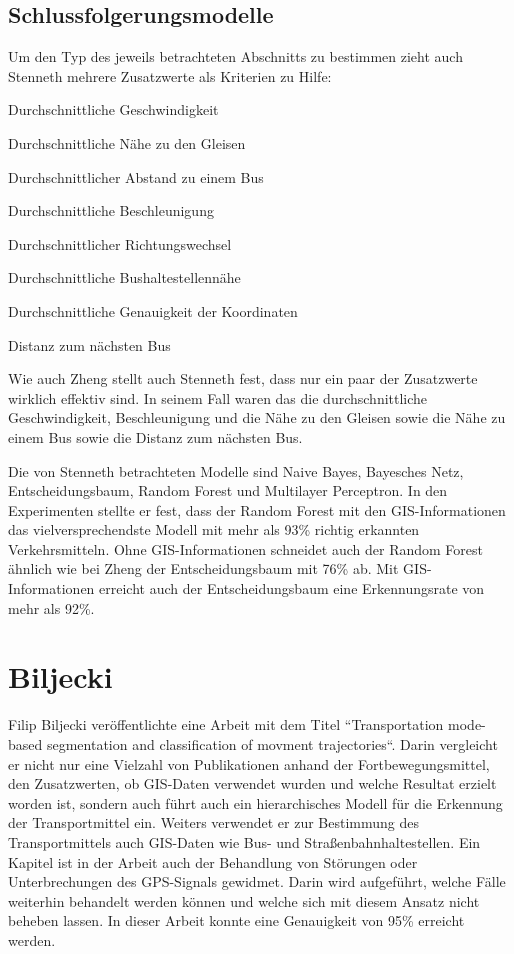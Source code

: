 \subsection{Schlussfolgerungsmodelle}
Um den Typ des jeweils betrachteten Abschnitts zu bestimmen zieht auch Stenneth mehrere Zusatzwerte als Kriterien zu Hilfe:

\begin{pitemize}
\item Durchschnittliche Geschwindigkeit
\item Durchschnittliche Nähe zu den Gleisen
\item Durchschnittlicher Abstand zu einem Bus
\item Durchschnittliche Beschleunigung
\item Durchschnittlicher Richtungswechsel
\item Durchschnittliche Bushaltestellennähe
\item Durchschnittliche Genauigkeit der Koordinaten
\item Distanz zum nächsten Bus
\end{pitemize}

Wie auch Zheng stellt auch Stenneth fest, dass nur ein paar der Zusatzwerte wirklich effektiv sind. In seinem Fall waren das die durchschnittliche Geschwindigkeit, Beschleunigung und die Nähe zu den Gleisen sowie die Nähe zu einem Bus sowie die Distanz zum nächsten Bus.

Die von Stenneth betrachteten Modelle sind Naive Bayes, Bayesches Netz, Entscheidungsbaum, Random Forest und Multilayer Perceptron. In den Experimenten stellte er fest, dass der Random Forest mit den GIS-Informationen das vielversprechendste Modell mit mehr als 93\% richtig erkannten Verkehrsmitteln. Ohne GIS-Informationen schneidet auch der Random Forest ähnlich wie bei Zheng der Entscheidungsbaum mit 76\% ab. Mit GIS-Informationen erreicht auch der Entscheidungsbaum eine Erkennungsrate von mehr als 92\%. 

\section{Biljecki}
Filip Biljecki veröffentlichte eine Arbeit mit dem Titel ``Transportation mode-based segmentation and classification of movment trajectories``. Darin vergleicht er nicht nur eine Vielzahl von Publikationen anhand der Fortbewegungsmittel, den Zusatzwerten, ob GIS-Daten verwendet wurden und welche Resultat erzielt worden ist, sondern auch führt auch ein hierarchisches Modell für die Erkennung der Transportmittel ein. Weiters verwendet er zur Bestimmung des Transportmittels auch GIS-Daten wie Bus- und Straßenbahnhaltestellen. Ein Kapitel ist in der Arbeit auch der Behandlung von Störungen oder Unterbrechungen des GPS-Signals gewidmet. Darin wird aufgeführt, welche Fälle weiterhin behandelt werden können und welche sich mit diesem Ansatz nicht beheben lassen. In dieser Arbeit konnte eine Genauigkeit von 95\% erreicht werden.

